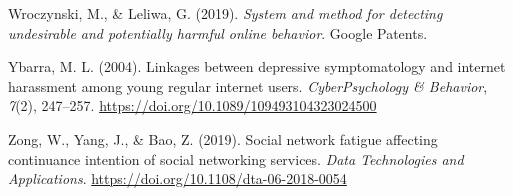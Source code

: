 \documentclass[10pt,dvipsnames]{scrartcl}
\begin{document}
\hypertarget{ref-wroczynski2019system}{}
Wroczynski, M., \& Leliwa, G. (2019). \emph{System and method for
detecting undesirable and potentially harmful online behavior}. Google
Patents.

\hypertarget{ref-ybarra2004linkages}{}
Ybarra, M. L. (2004). Linkages between depressive symptomatology and
internet harassment among young regular internet users.
\emph{CyberPsychology \& Behavior}, \emph{7}(2), 247--257.
\url{https://doi.org/10.1089/109493104323024500}

\hypertarget{ref-zong2019social}{}
Zong, W., Yang, J., \& Bao, Z. (2019). Social network fatigue affecting
continuance intention of social networking services. \emph{Data
Technologies and Applications}.
\url{https://doi.org/10.1108/dta-06-2018-0054}
\end{document}

